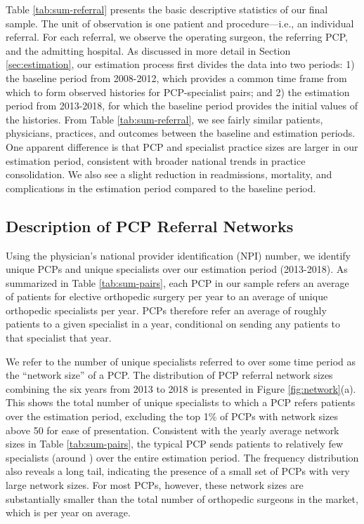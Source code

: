 \documentclass[12pt]{article}
\begin{document}
Table \ref{tab:sum-referral} presents the basic descriptive statistics of our final sample. The unit of observation is one patient and procedure---i.e., an individual referral. For each referral, we observe the operating surgeon, the referring PCP, and the admitting hospital. As discussed in more detail in Section \ref{sec:estimation}, our estimation process first divides the data into two periods: 1) the baseline period from 2008-2012, which provides a common time frame from which to form observed histories for PCP-specialist pairs; and 2) the estimation period from 2013-2018, for which the baseline period provides the initial values of the histories. From Table \ref{tab:sum-referral}, we see fairly similar patients, physicians, practices, and outcomes between the baseline and estimation periods. One apparent difference is that PCP and specialist practice sizes are larger in our estimation period, consistent with broader national trends in practice consolidation. We also see a slight reduction in readmissions, mortality, and complications in the estimation period compared to the baseline period. 

\subsection{Description of PCP Referral Networks}
\label{sec:network-description}
Using the physician's national provider identification (NPI) number, we identify \nPCPs{} unique PCPs and \nSpecialists{} unique specialists over our estimation period (2013-2018). As summarized in Table \ref{tab:sum-pairs}, each PCP in our sample refers an average of \meanRefsPerPCP{} patients for elective orthopedic surgery per year to an average of \meanSpecsPerPCP{} unique orthopedic specialists per year. PCPs therefore refer an average of roughly \meanRefsPerPair{} patients to a given specialist in a year, conditional on sending any patients to that specialist that year. 

We refer to the number of unique specialists referred to over some time period as the ``network size'' of a PCP. The distribution of PCP referral network sizes combining the six years from 2013 to 2018 is presented in Figure \ref{fig:network}(a). This shows the total number of unique specialists to which a PCP refers patients over the estimation period, excluding the top 1\% of PCPs with network sizes above 50 for ease of presentation. Consistent with the yearly average network sizes in Table \ref{tab:sum-pairs}, the typical PCP sends patients to relatively few specialists (around \cumlNetworkSize{}) over the entire estimation period. The frequency distribution also reveals a long tail, indicating the presence of a small set of PCPs with very large network sizes. For most PCPs, however, these network sizes are substantially smaller than the total number of orthopedic surgeons in the market, which is \specsPerHRRYear{} per year on average.
\end{document}
